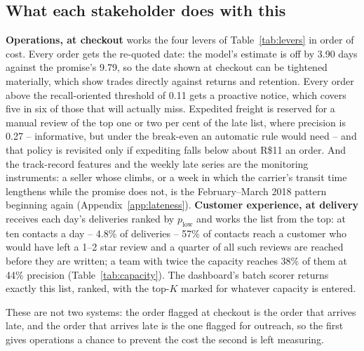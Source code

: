 \subsection{What each stakeholder does with this}
\label{sec:stakeholders}

\textbf{Operations, at checkout} works the four levers of Table~\ref{tab:levers}
in order of cost. Every order gets the re-quoted date: the model's estimate is
off by 3.90 days against the promise's 9.79, so the date shown at checkout can
be tightened materially, which \citet{cui2024promise} show trades directly
against returns and retention. Every order above the recall-oriented threshold
of 0.11 gets a proactive notice, which covers five in six of those that will
actually miss. Expedited freight is reserved for a manual review of the top one
or two per cent of the late list, where precision is 0.27 -- informative, but
under the break-even an automatic rule would need -- and that policy is
revisited only if expediting falls below about R\$11 an order. And the
track-record features and the weekly late series are the monitoring
instruments: a seller whose  climbs, or a week in
which the carrier's transit time lengthens while the promise does not, is the
February--March 2018 pattern beginning again (Appendix~\ref{app:lateness}).
\textbf{Customer experience, at delivery} receives each day's deliveries ranked
by $p_{\text{low}}$ and works the list from the top: at ten contacts a day --
4.8\% of deliveries -- 57\% of contacts reach a customer who would have left a
1--2 star review and a quarter of all such reviews are reached before they are
written; a team with twice the capacity reaches 38\% of them at 44\% precision
(Table~\ref{tab:capacity}). The dashboard's batch scorer returns exactly this
list, ranked, with the top-$K$ marked for whatever capacity is entered.

These are not two systems: the order flagged at checkout is the order that
arrives late, and the order that arrives late is the one flagged for outreach, so
the first gives operations a chance to prevent the cost the second is left
measuring.
